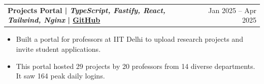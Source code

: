 \documentclass[a4paper,11pt]{article}
\makeatletter
\newenvironment{joblong}[2]
    {
    \begin{tabularx}{\linewidth}{@{}l X r@{}}
    \textbf{#1} & \hfill &  #2 \\[3.75pt]
    \end{tabularx}
    \begin{minipage}[t]{\linewidth}
    \begin{itemize}[nosep,after=\strut, leftmargin=1em, itemsep=0pt,label=--]
    }
    {
    \end{itemize}
    \end{minipage}  
    }
\makeatother
\begin{document}
\begin{joblong}{Projects Portal | \small \textit{TypeScript, Fastify, React, Tailwind, Nginx} | \small \href{https://github.com/0xDevansh/projector}{GitHub}}{Jan 2025 -- Apr 2025}
\item Built a portal for professors at IIT Delhi to upload research projects and invite student applications.
\item This portal hosted 29 projects by 20 professors from 14 diverse departments. It saw 164 peak daily logins.
\end{joblong}



\end{document}
